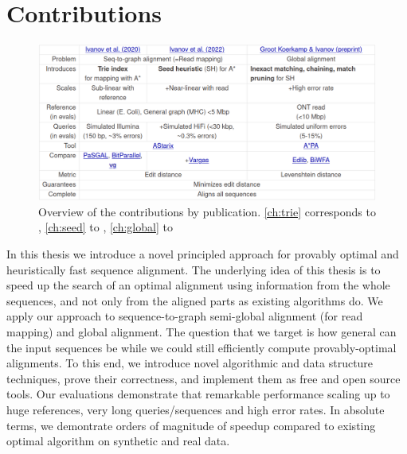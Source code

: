 \section*{Contributions}

\begin{figure}[h]
  \includegraphics[width=1.0\linewidth]{media/ownpubs-table.png}
  \caption{Overview of the contributions by publication. \cref{ch:trie}
  corresponds to \citep{ivanov2020astarix}, \cref{ch:seed} to
  \citep{ivanov2022fast}, \cref{ch:global} to \citep{koerkamp2022exact}}
  \label{tab:ownpubs}
\end{figure}

In this thesis we introduce a novel principled approach for provably optimal and
heuristically fast sequence alignment. The underlying idea of this thesis is to
speed up the search of an optimal alignment using information from the whole
sequences, and not only from the aligned parts as existing algorithms do. We
apply our approach to sequence-to-graph semi-global alignment (for read mapping)
and global alignment. The question that we target is how general can the input
sequences be while we could still efficiently compute provably-optimal
alignments. To this end, we introduce novel algorithmic and data structure
techniques, prove their correctness, and implement them as free and open source
tools. Our evaluations demonstrate that remarkable performance scaling up to
huge references, very long queries/sequences and high error rates. In absolute
terms, we demontrate orders of magnitude of speedup compared to existing optimal
algorithm on synthetic and real data.


